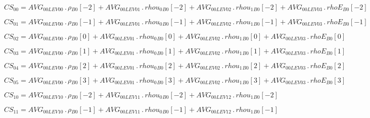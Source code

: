 \documentclass{article}
\begin{document}
\begin{dmath}CS_{00} = AVG_{0 0 LEV 00} \,.\, {\rho{_{B0}}}[{-2}] + AVG_{0 0 LEV 01} \,.\, {rhou_{0}{_{B0}}}[{-2}] + AVG_{0 0 LEV 02} \,.\, {rhou_{1}{_{B0}}}[{-2}] + AVG_{0 0 LEV 03} \,.\, {rhoE{_{B0}}}[{-2}]\end{dmath}

\begin{dmath}CS_{01} = AVG_{0 0 LEV 00} \,.\, {\rho{_{B0}}}[{-1}] + AVG_{0 0 LEV 01} \,.\, {rhou_{0}{_{B0}}}[{-1}] + AVG_{0 0 LEV 02} \,.\, {rhou_{1}{_{B0}}}[{-1}] + AVG_{0 0 LEV 03} \,.\, {rhoE{_{B0}}}[{-1}]\end{dmath}

\begin{dmath}CS_{02} = AVG_{0 0 LEV 00} \,.\, {\rho{_{B0}}}[{0}] + AVG_{0 0 LEV 01} \,.\, {rhou_{0}{_{B0}}}[{0}] + AVG_{0 0 LEV 02} \,.\, {rhou_{1}{_{B0}}}[{0}] + AVG_{0 0 LEV 03} \,.\, {rhoE{_{B0}}}[{0}]\end{dmath}

\begin{dmath}CS_{03} = AVG_{0 0 LEV 00} \,.\, {\rho{_{B0}}}[{1}] + AVG_{0 0 LEV 01} \,.\, {rhou_{0}{_{B0}}}[{1}] + AVG_{0 0 LEV 02} \,.\, {rhou_{1}{_{B0}}}[{1}] + AVG_{0 0 LEV 03} \,.\, {rhoE{_{B0}}}[{1}]\end{dmath}

\begin{dmath}CS_{04} = AVG_{0 0 LEV 00} \,.\, {\rho{_{B0}}}[{2}] + AVG_{0 0 LEV 01} \,.\, {rhou_{0}{_{B0}}}[{2}] + AVG_{0 0 LEV 02} \,.\, {rhou_{1}{_{B0}}}[{2}] + AVG_{0 0 LEV 03} \,.\, {rhoE{_{B0}}}[{2}]\end{dmath}

\begin{dmath}CS_{05} = AVG_{0 0 LEV 00} \,.\, {\rho{_{B0}}}[{3}] + AVG_{0 0 LEV 01} \,.\, {rhou_{0}{_{B0}}}[{3}] + AVG_{0 0 LEV 02} \,.\, {rhou_{1}{_{B0}}}[{3}] + AVG_{0 0 LEV 03} \,.\, {rhoE{_{B0}}}[{3}]\end{dmath}

\begin{dmath}CS_{10} = AVG_{0 0 LEV 10} \,.\, {\rho{_{B0}}}[{-2}] + AVG_{0 0 LEV 11} \,.\, {rhou_{0}{_{B0}}}[{-2}] + AVG_{0 0 LEV 12} \,.\, {rhou_{1}{_{B0}}}[{-2}]\end{dmath}

\begin{dmath}CS_{11} = AVG_{0 0 LEV 10} \,.\, {\rho{_{B0}}}[{-1}] + AVG_{0 0 LEV 11} \,.\, {rhou_{0}{_{B0}}}[{-1}] + AVG_{0 0 LEV 12} \,.\, {rhou_{1}{_{B0}}}[{-1}]\end{dmath}
\end{document}
